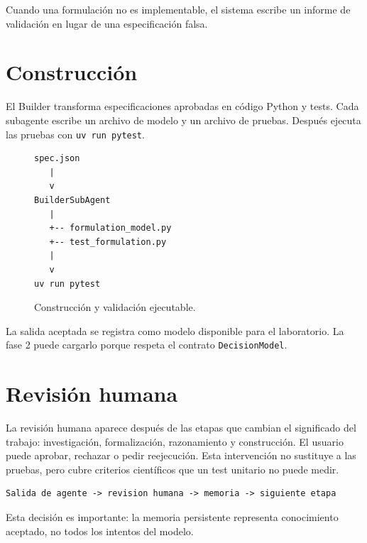 Cuando una formulación no es implementable, el sistema escribe un informe de
validación en lugar de una especificación falsa.

\section{Construcción}

El Builder transforma especificaciones aprobadas en código Python y tests. Cada
subagente escribe un archivo de modelo y un archivo de pruebas. Después ejecuta
las pruebas con \texttt{uv run pytest}.

\begin{figure}[H]
\centering
\begin{verbatim}
spec.json
   |
   v
BuilderSubAgent
   |
   +-- formulation_model.py
   +-- test_formulation.py
   |
   v
uv run pytest
\end{verbatim}
\caption{Construcción y validación ejecutable.}
\end{figure}

La salida aceptada se registra como modelo disponible para el laboratorio. La
fase 2 puede cargarlo porque respeta el contrato \texttt{DecisionModel}.

\section{Revisión humana}

La revisión humana aparece después de las etapas que cambian el significado del
trabajo: investigación, formalización, razonamiento y construcción. El usuario
puede aprobar, rechazar o pedir reejecución. Esta intervención no sustituye a
las pruebas, pero cubre criterios científicos que un test unitario no puede
medir.

\begin{verbatim}
Salida de agente -> revision humana -> memoria -> siguiente etapa
\end{verbatim}

Esta decisión es importante: la memoria persistente representa conocimiento
aceptado, no todos los intentos del modelo.
